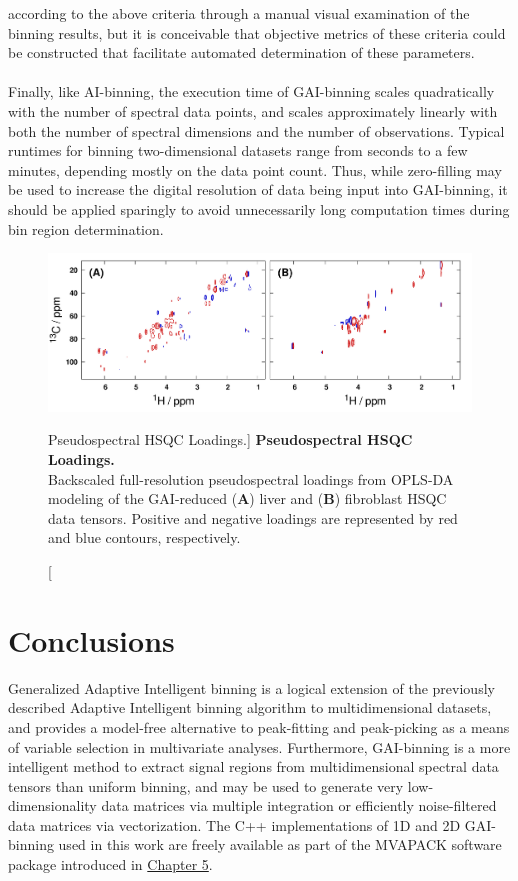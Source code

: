 \begin{doublespace}
according to the above criteria through a manual visual examination of the
binning results, but it is conceivable that objective metrics of these criteria
could be constructed that facilitate automated determination of these
parameters.
\\\\
Finally, like AI-binning, the execution time of GAI-binning scales
quadratically with the number of spectral data points, and scales approximately
linearly with both the number of spectral dimensions and the number of
observations. Typical runtimes for binning two-dimensional datasets range from
seconds to a few minutes, depending mostly on the data point count. Thus,
while zero-filling may be used to increase the digital resolution of data
being input into GAI-binning, it should be applied sparingly to avoid
unnecessarily long computation times during bin region determination.
\end{doublespace}

\begin{figure}[hb!]
\includegraphics[width=6in]{figs/gaibin/05-loadings.png}
\caption
      [Pseudospectral HSQC Loadings.]{
  {\bf Pseudospectral HSQC Loadings.}
  \\
  Backscaled full-resolution pseudospectral loadings from OPLS-DA modeling of
  the GAI-reduced ({\bf A}) liver and ({\bf B}) fibroblast \hcnmr{} HSQC data
  tensors. Positive and negative loadings are represented by red and blue
  contours, respectively.
}
\label{figure.8.5}
\end{figure}

\section{Conclusions}

\begin{doublespace}
Generalized Adaptive Intelligent binning is a logical extension of the
previously described Adaptive Intelligent binning algorithm
\cite{demeyer:anchem2008} to multidimensional datasets, and provides a
model-free alternative to peak-fitting and peak-picking as a means of variable
selection in multivariate analyses. Furthermore, GAI-binning is a more
intelligent method to extract signal regions from multidimensional spectral
data tensors than uniform binning, and may be used to generate very
low-dimensionality data matrices via multiple integration or efficiently
noise-filtered data matrices via vectorization. The C++ implementations of
1D and 2D GAI-binning used in this work are freely available as part of the
MVAPACK software package \cite{worley:acscb2014} introduced in
\hyperlink{chapter.5}{Chapter 5}.
\end{doublespace}

